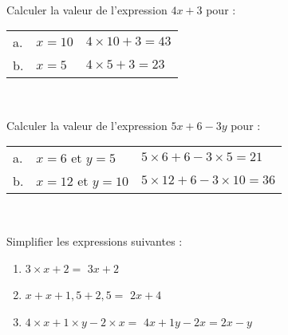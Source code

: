 \documentclass[a4paper,12pt,landscape,twocolumn]{article}
\newcommand{\correction}[1]{{\color{red}#1}}
\begin{document}
{	\begin{exercice}\

		Calculer la valeur de l'expression $4x + 3$ pour : \vspace{0.5em}

		\begin{tabular}{llm{4cm}}
			a. & $x = 10$ & \correction{$4 × 10 + 3 = 43$} \\
			b. & $x = 5$  & \correction{$4 × 5 + 3 = 23$}  \\
		\end{tabular}
	\end{exercice}

	\begin{exercice}\

		Calculer la valeur de l'expression $5x + 6 - 3y$ pour : \vspace{0.5em}

		\begin{tabular}{lll}
			a. & $x = 6$ et $y = 5$   & \correction{$5 × 6 + 6 - 3 × 5 = 21$}   \\
			b. & $x = 12$ et $y = 10$ & \correction{$5 × 12 + 6 - 3 × 10 = 36$} \\
		\end{tabular}
	\end{exercice}

	\begin{exercice}\

		Simplifier les expressions suivantes : \vspace{0.5em}
		\begin{enumerate}[label=\alph*.]
			\setlength\itemsep{5pt}
			\item $3 × x + 2 = $ \correction{$3x + 2$}
			\item $x + x + 1{,}5 + 2{,}5 = $ \correction{$2x + 4$}
			\item $4 × x + 1 × y  - 2 × x = $ \correction{$4x + 1y - 2x = 2x - y$}
		\end{enumerate}
	\end{exercice}
}

\newpage

\setcounter{exercice}{0}
\end{document}
